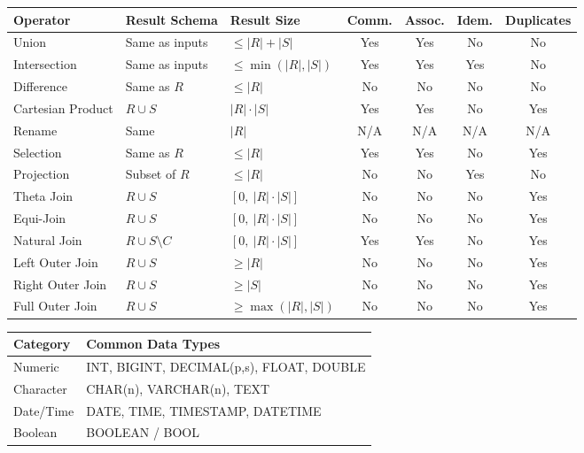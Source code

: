 \documentclass{article}
\begin{document}
\begin{table}[h]
\centering
\begin{tabular}{|l|l|l|c|c|c|c|}
\hline
\textbf{Operator} & \textbf{Result Schema} & \textbf{Result Size} & \textbf{Comm.} & \textbf{Assoc.} & \textbf{Idem.} & \textbf{Duplicates} \\
\hline
Union & Same as inputs & $\leq |R| + |S|$ & Yes & Yes & No & No \\
\hline
Intersection & Same as inputs & $\leq \min(|R|, |S|)$ & Yes & Yes & Yes & No \\
\hline
Difference & Same as $R$ & $\leq |R|$ & No & No & No & No \\
\hline
Cartesian Product & $R \cup S$ & $|R| \cdot |S|$ & Yes & Yes & No & Yes \\
\hline
Rename & Same & $|R|$ & N/A & N/A & N/A & N/A \\
\hline
Selection & Same as $R$ & $\leq |R|$ & Yes & Yes & No & Yes \\
\hline
Projection & Subset of $R$ & $\leq |R|$ & No & No & Yes & No \\
\hline
Theta Join & $R \cup S$ & $[0,\ |R| \cdot |S|]$ & No & No & No & Yes \\
\hline
Equi-Join     & $R \cup S$ & $[0,\ |R| \cdot |S|]$ & No & No & No & Yes \\
\hline
Natural Join & $R \cup S\setminus C$ & $[0,\ |R| \cdot |S|]$ & Yes & Yes & No & Yes \\
\hline
Left Outer Join & $R \cup S$ & $\geq |R|$ & No & No & No & Yes \\
\hline
Right Outer Join & $R \cup S$ & $\geq |S|$ & No & No & No & Yes \\
\hline
Full Outer Join & $R \cup S$ & $\geq \max(|R|, |S|)$ & No & No & No & Yes \\
\hline
\end{tabular}
\end{table}


\begin{table}[h]
\centering
\begin{tabular}{|l|l|}
\hline
\textbf{Category} & \textbf{Common Data Types} \\ \hline
Numeric           & INT, BIGINT, DECIMAL(p,s), FLOAT, DOUBLE \\ \hline
Character         & CHAR(n), VARCHAR(n), TEXT                 \\ \hline
Date/Time         & DATE, TIME, TIMESTAMP, DATETIME           \\ \hline
Boolean           & BOOLEAN / BOOL                             \\ \hline
\end{tabular}
\end{table}
\end{document}

